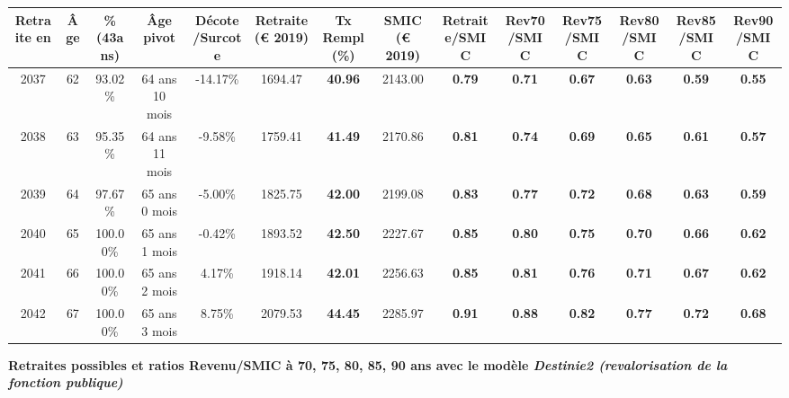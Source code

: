 \begin{adjustbox}{max width=\textwidth} 
\begin{tabular}[htb]{|c|c||c|c|c||c|c||c||c|c|c|c|c|c|} 
\hline 
 Retraite en &  Âge &  \%(43ans) &  Âge pivot &  Décote/Surcote &  Retraite (\euro{} 2019) &  Tx Rempl(\%) &  SMIC (\euro{} 2019) &  Retraite/SMIC &  Rev70/SMIC &  Rev75/SMIC &  Rev80/SMIC &  Rev85/SMIC &  Rev90/SMIC \\ 
\hline \hline 
 2037 &  62 &  93.02\% &  64 ans 10 mois &  -14.17\% &  1694.47 &  {\bf 40.96} &  2143.00 &  {\bf {\color{red} 0.79}} &  {\bf {\color{red} 0.71}} &  {\bf {\color{red} 0.67}} &  {\bf {\color{red} 0.63}} &  {\bf {\color{red} 0.59}} &  {\bf {\color{red} 0.55}} \\ 
\hline 
 2038 &  63 &  95.35\% &  64 ans 11 mois &  -9.58\% &  1759.41 &  {\bf 41.49} &  2170.86 &  {\bf {\color{red} 0.81}} &  {\bf {\color{red} 0.74}} &  {\bf {\color{red} 0.69}} &  {\bf {\color{red} 0.65}} &  {\bf {\color{red} 0.61}} &  {\bf {\color{red} 0.57}} \\ 
\hline 
 2039 &  64 &  97.67\% &  65 ans 0 mois &  -5.00\% &  1825.75 &  {\bf 42.00} &  2199.08 &  {\bf {\color{red} 0.83}} &  {\bf {\color{red} 0.77}} &  {\bf {\color{red} 0.72}} &  {\bf {\color{red} 0.68}} &  {\bf {\color{red} 0.63}} &  {\bf {\color{red} 0.59}} \\ 
\hline 
 2040 &  65 &  100.00\% &  65 ans 1 mois &  -0.42\% &  1893.52 &  {\bf 42.50} &  2227.67 &  {\bf {\color{red} 0.85}} &  {\bf {\color{red} 0.80}} &  {\bf {\color{red} 0.75}} &  {\bf {\color{red} 0.70}} &  {\bf {\color{red} 0.66}} &  {\bf {\color{red} 0.62}} \\ 
\hline 
 2041 &  66 &  100.00\% &  65 ans 2 mois &  4.17\% &  1918.14 &  {\bf 42.01} &  2256.63 &  {\bf {\color{red} 0.85}} &  {\bf {\color{red} 0.81}} &  {\bf {\color{red} 0.76}} &  {\bf {\color{red} 0.71}} &  {\bf {\color{red} 0.67}} &  {\bf {\color{red} 0.62}} \\ 
\hline 
 2042 &  67 &  100.00\% &  65 ans 3 mois &  8.75\% &  2079.53 &  {\bf 44.45} &  2285.97 &  {\bf {\color{red} 0.91}} &  {\bf {\color{red} 0.88}} &  {\bf {\color{red} 0.82}} &  {\bf {\color{red} 0.77}} &  {\bf {\color{red} 0.72}} &  {\bf {\color{red} 0.68}} \\ 
\hline 
\hline 
\end{tabular} 
\end{adjustbox} 
 
 \vspace{0.1cm} 
{\bf \noindent Retraites possibles et ratios Revenu/SMIC à 70, 75, 80, 85, 90 ans avec le modèle \emph{Destinie2 (revalorisation de la fonction publique)}}  
 

